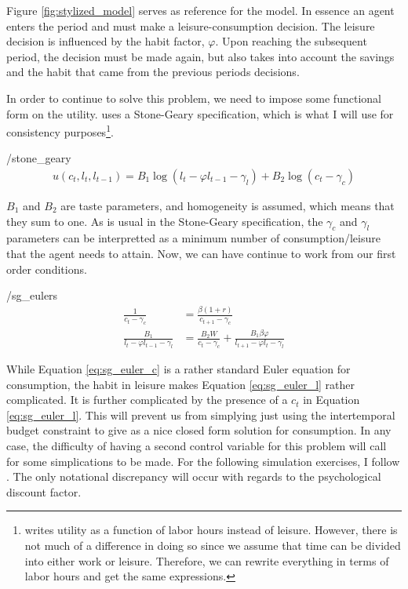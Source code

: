 \documentclass[ProjectMMD]{subfiles}
\begin{document}
\providecommand{\figName}{stylized_model} %
\providecommand{\figFile}{\figName} %
\hypertarget{\figFile}{}
Figure \ref{fig:stylized_model} serves as reference for the model. In essence an agent enters the period and must make a leisure-consumption decision. The leisure decision is influenced by the habit factor, $\varphi$. Upon reaching the subsequent period, the decision must be made again, but also takes into account the savings and the habit that came from the previous periods decisions.

In order to continue to solve this problem, we need to impose some functional form on the utility. \cite{bover1991relaxing} uses a Stone-Geary specification, which is what I will use for consistency purposes\footnote{\cite{bover1991relaxing} writes utility as a function of labor hours instead of leisure. However, there is not much of a difference in doing so since we assume that time can be divided into either work or leisure. Therefore, we can rewrite everything in terms of labor hours and get the same expressions.}.
\begin{verbatimwrite}{\EqDir/stone_geary}
  \begin{align}
    u(c_t, l_t, l_{t-1}) = B_1 \log \left(l_t - \varphi l_{t-1} - \gamma_l \right)+  B_2 \log \left(c_t - \gamma_c \right)  \label{eq:sg}
  \end{align}
\end{verbatimwrite}

$B_1$ and $B_2$ are taste parameters, and homogeneity is assumed, which means that they sum to one. As is usual in the Stone-Geary specification, the $\gamma_c$ and $\gamma_l$ parameters can be interpretted as a minimum number of consumption/leisure that the agent needs to attain. Now, we can have continue to work from our first order conditions.

\begin{verbatimwrite}{\EqDir/sg_eulers}
  \begin{align}
    \frac{1}{c_t -\gamma_c} &=\frac{\beta(1+r)}{c_{t+1}-\gamma_c} \label{eq:sg_euler_c} \\
    \frac{B_1}{l_t - \varphi l_{t-1} - \gamma_l} &= \frac{B_2 W}{c_t - \gamma_c} + \frac{B_1 \beta \varphi}{l_{t+1}-\varphi l_t - \gamma_l} \label{eq:sg_euler_l}
  \end{align}
\end{verbatimwrite}

While Equation \eqref{eq:sg_euler_c} is a rather standard Euler equation for consumption, the habit in leisure makes Equation \eqref{eq:sg_euler_l} rather complicated. It is further complicated by the presence of a $c_t$ in Equation \eqref{eq:sg_euler_l}. This will prevent us from simplying just using the intertemporal budget constraint to give as a nice closed form solution for consumption. In any case, the difficulty of having a second control variable for this problem will call for some simplications to be made. For the following simulation exercises, I follow \cite{bover1991relaxing}. The only notational discrepancy will occur with regards to the psychological discount factor. 
\hypertarget{Simulations}{}
\end{document}
